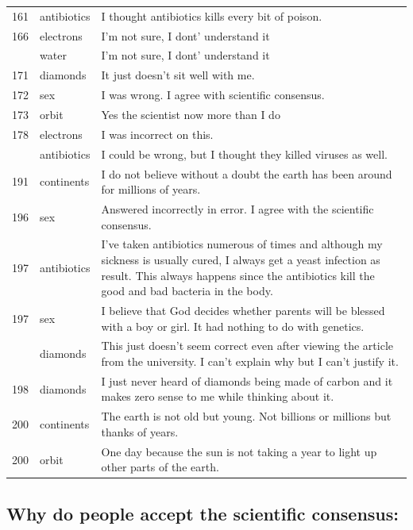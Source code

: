 \documentclass[
  doc,floatsintext]{apa6}
\begin{document}
\begin{longtable}[t]{>{}r>{}l>{\raggedright\arraybackslash}p{30em}}
161 & antibiotics & I thought antibiotics kills every bit of poison.\\
166 & electrons & I'm not sure, I dont' understand it\\
\addlinespace
166 & water & I'm not sure, I dont' understand it\\
171 & diamonds & It just doesn't sit well with me.\\
172 & sex & I was wrong. I agree with scientific consensus.\\
173 & orbit & Yes the scientist now more than I do\\
178 & electrons & I was incorrect on this.\\
\addlinespace
191 & antibiotics & I could be wrong, but I thought they killed viruses as well.\\
191 & continents & I do not believe without a doubt the earth has been around for millions of years.\\
196 & sex & Answered incorrectly in error.  I agree with the scientific consensus.\\
197 & antibiotics & I’ve taken antibiotics numerous of times and although my sickness is usually cured, I always get a yeast infection as result. This always happens since the antibiotics kill the good and bad bacteria in the body.\\
197 & sex & I believe that God decides whether parents will be blessed with a boy or girl. It had nothing to do with genetics.\\
\addlinespace
197 & diamonds & This just doesn’t seem correct even after viewing the article from the university. I can’t explain why but I can’t justify it.\\
198 & diamonds & I just never heard of diamonds being made of carbon and it makes zero sense to me while thinking about it.\\
200 & continents & The earth is not old but young. Not billions or millions but thanks of years.\\
200 & orbit & One day because the sun is not taking a year to light up other parts of the earth.\\
\bottomrule
\end{longtable}

\subsection{Why do people accept the scientific consensus:}\label{why-do-people-accept-the-scientific-consensus}
\end{document}
